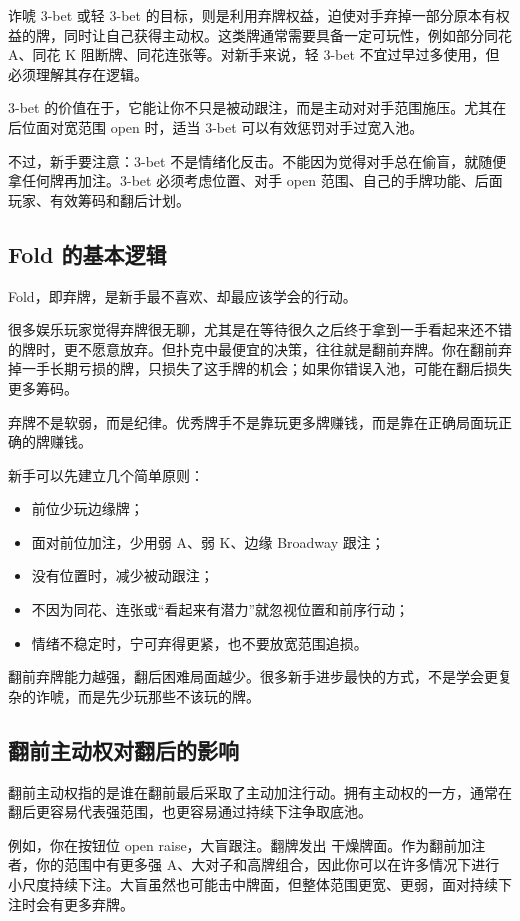 诈唬 3-bet 或轻 3-bet 的目标，则是利用弃牌权益，迫使对手弃掉一部分原本有权益的牌，同时让自己获得主动权。这类牌通常需要具备一定可玩性，例如部分同花 A、同花 K 阻断牌、同花连张等。对新手来说，轻 3-bet 不宜过早过多使用，但必须理解其存在逻辑。

3-bet 的价值在于，它能让你不只是被动跟注，而是主动对对手范围施压。尤其在后位面对宽范围 open 时，适当 3-bet 可以有效惩罚对手过宽入池。

不过，新手要注意：3-bet 不是情绪化反击。不能因为觉得对手总在偷盲，就随便拿任何牌再加注。3-bet 必须考虑位置、对手 open 范围、自己的手牌功能、后面玩家、有效筹码和翻后计划。

\subsection{Fold 的基本逻辑}

Fold，即弃牌，是新手最不喜欢、却最应该学会的行动。

很多娱乐玩家觉得弃牌很无聊，尤其是在等待很久之后终于拿到一手看起来还不错的牌时，更不愿意放弃。但扑克中最便宜的决策，往往就是翻前弃牌。你在翻前弃掉一手长期亏损的牌，只损失了这手牌的机会；如果你错误入池，可能在翻后损失更多筹码。

弃牌不是软弱，而是纪律。优秀牌手不是靠玩更多牌赚钱，而是靠在正确局面玩正确的牌赚钱。

新手可以先建立几个简单原则：

\begin{itemize}
\item 前位少玩边缘牌；
\item 面对前位加注，少用弱 A、弱 K、边缘 Broadway 跟注；
\item 没有位置时，减少被动跟注；
\item 不因为同花、连张或“看起来有潜力”就忽视位置和前序行动；
\item 情绪不稳定时，宁可弃得更紧，也不要放宽范围追损。
\end{itemize}

翻前弃牌能力越强，翻后困难局面越少。很多新手进步最快的方式，不是学会更复杂的诈唬，而是先少玩那些不该玩的牌。

\subsection{翻前主动权对翻后的影响}

翻前主动权指的是谁在翻前最后采取了主动加注行动。拥有主动权的一方，通常在翻后更容易代表强范围，也更容易通过持续下注争取底池。

例如，你在按钮位 open raise，大盲跟注。翻牌发出  干燥牌面。作为翻前加注者，你的范围中有更多强 A、大对子和高牌组合，因此你可以在许多情况下进行小尺度持续下注。大盲虽然也可能击中牌面，但整体范围更宽、更弱，面对持续下注时会有更多弃牌。

